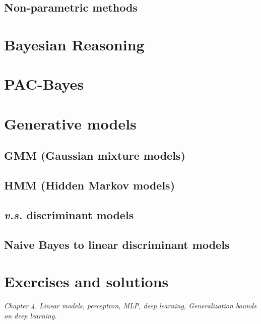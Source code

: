 \documentclass{article}
\begin{document}
	\subsection{Non-parametric methods}

\section{Bayesian Reasoning}

\section{PAC-Bayes}

\section{Generative models}
	\subsection{GMM (Gaussian mixture models)}
	\subsection{HMM (Hidden Markov models)}
	\subsection{\textit{v.s.} discriminant models}
	\subsection{Naive Bayes to linear discriminant models}


\section{Exercises and solutions}

\textit{
      Chapter 4. Linear models, perceptron, MLP, deep learning, Generalization bounds on deep learning.}
\end{document}
